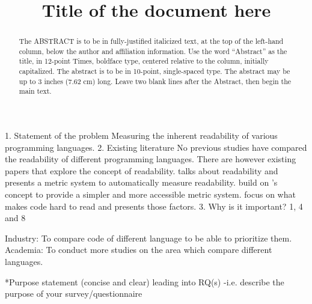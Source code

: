 \documentclass[times, 10pt,twocolumn]{IEEEtran}
\begin{document}
\title{Title of the document here}

\author{


}
\maketitle
\thispagestyle{empty}

\begin{abstract}
   The ABSTRACT is to be in fully-justified italicized text, at the top 
   of the left-hand column, below the author and affiliation 
   information. Use the word ``Abstract'' as the title, in 12-point 
   Times, boldface type, centered relative to the column, initially 
   capitalized. The abstract is to be in 10-point, single-spaced type. 
   The abstract may be up to 3 inches (7.62 cm) long. Leave two blank 
   lines after the Abstract, then begin the main text. 
\end{abstract}




1. Statement of the problem
  Measuring the inherent readability of various programming languages. 
2. Existing literature
  No previous studies have compared the readability of different programming languages. There are however existing papers that explore the concept of readability. \cite{buse2010learning} talks about readability and presents a metric system to automatically measure readability. \cite{posnett2011simpler} build on \cite{buse2010learning}'s concept to provide a simpler and more accessible metric system. \cite{hansen2013makes} focus on what makes code hard to read and presents those factors. 
3. Why is it important? 
1, 4 and 8

Industry: To compare code of different language to be able to prioritize them. 
Academia: To conduct more studies on the area which compare different languages.



*Purpose statement (concise  and clear)  leading into  RQ(s)
 -i.e.  describe  the purpose of  your  survey/questionnaire
\end{document}
